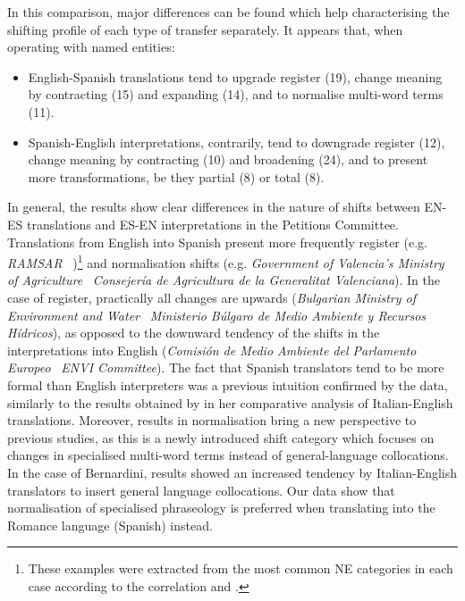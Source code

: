 \documentclass[output=paper]{langscibook}
\begin{document}
In this comparison, major differences can be found which help characterising the shifting profile of each type of transfer separately. It appears that, when operating with named entities:

\begin{itemize}
\item 
English-Spanish translations tend to upgrade register (19), change meaning by contracting (15) and expanding (14), and to normalise multi-word terms (11).

\item 
Spanish-English interpretations, contrarily, tend to downgrade register (12), change meaning by contracting (10) and broadening (24), and to present more transformations, be they partial (8) or total (8). 

\end{itemize}

In general, the results show clear differences in the nature of shifts between EN-ES translations and ES-EN interpretations in the Petitions Committee. Translations from English into Spanish present more frequently register (e.g. \textit{RAMSAR} \rightarrow$\,$ )\footnote{These examples were extracted from the most common NE categories in each case according to the correlation  and .} and normalisation shifts (e.g. \textit{Government of Valencia's Ministry of Agriculture} \rightarrow$\,$ \textit{Consejería de Agricultura de la Generalitat Valenciana}). In the case of register, practically all changes are upwards (\textit{Bulgarian Ministry of Environment and Water} \rightarrow$\,$ \textit{Ministerio Búlgaro de Medio Ambiente y Recursos Hídricos}), as opposed to the downward tendency of the shifts in the interpretations into English (\textit{Comisión de Medio Ambiente del Parlamento Europeo} \rightarrow$\,$ \textit{ENVI Committee}). The fact that Spanish translators tend to be more formal than English interpreters was a previous intuition confirmed by the data, similarly to the results obtained by \citet[143--144]{Bernardini2016} in her comparative analysis of Italian-English translations. Moreover, results in normalisation bring a new perspective to previous studies, as this is a newly introduced shift category which focuses on changes in specialised multi-word terms instead of general-language collocations. In the case of Bernardini, results showed an increased tendency by Italian-English translators to insert general language collocations. Our data show that normalisation of specialised phraseology is preferred when translating into the Romance language (Spanish) instead.
\end{document}
